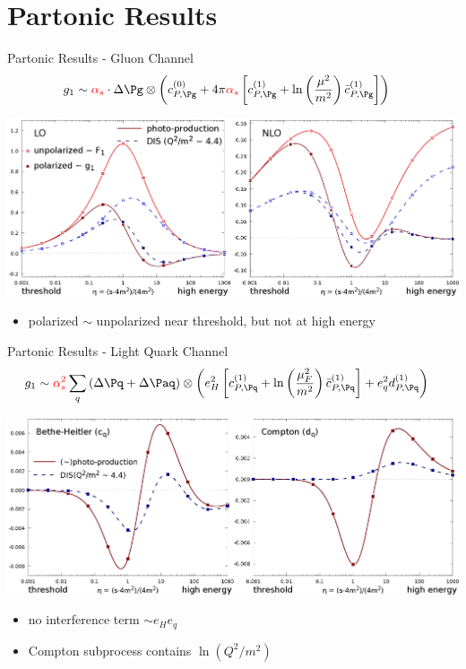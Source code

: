 \section{Partonic Results}
\begin{frame}{Partonic Results - Gluon Channel}
\begin{align*}
g_1 &\sim {\color{red}\alpha_s}\cdot\Delta \Pg \otimes \left(c_{P,\Pg}^{(0)} + 4\pi{\color{red}\alpha_s}\left[c_{P,\Pg}^{(1)} + \ln\left(\frac{\mu^2}{m^2}\right)\bar c_{P,\Pg}^{(1)}\right]\right)
\end{align*}
\begin{center}
\includegraphics[width=\textwidth]{img/cgTP-new}
\end{center}
\begin{itemize}
\item polarized $\sim$ unpolarized near threshold, but not at high energy
\end{itemize}
\end{frame}

\begin{frame}{Partonic Results - Light Quark Channel}
\begin{align*}
g_1 &\sim {\color{red}\alpha_s^2}\sum_{q}\left(\Delta \Pq+\Delta \Paq\right) \otimes \left(e_H^2\left[c_{P,\Pq}^{(1)} + \ln\left(\frac{\mu_F^2}{m^2}\right)\bar c_{P,\Pq}^{(1)}\right] + e_q^2 d_{P,\Pq}^{(1)}\right)
\end{align*}
\begin{center}
\includegraphics[width=.9\textwidth]{img/cdqP-new}
\end{center}
\begin{itemize}
\item no interference term $\sim e_He_q$
\item Compton subprocess contains $\ln(Q^2/m^2)$
\end{itemize}
\end{frame}
